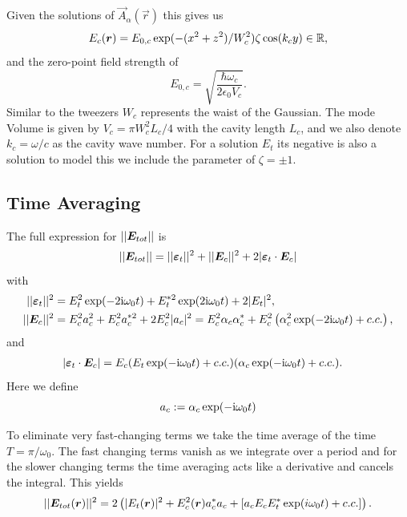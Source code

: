 Given the solutions of $\vec A_\alpha(\vec r)$ this gives us
\begin{equation}
    \label{eq:sp:Ec}
    E_c(\bm{r}) = E_{0,c} \exp(-(x^2+z^2)/W_c^2) \zeta \cos(k_c y) \in \mathbb{R},
\end{equation}
and the zero-point field strength of
\begin{equation}
    \label{eq:sp:Ec0}
    E_{0, c} = \sqrt{\frac{\hbar \omega_c}{2\epsilon_0 V_c}}.
\end{equation}
Similar to the tweezers $W_c$ represents the waist of the Gaussian.
The mode Volume is given by $V_c = \pi W_c^2 L_c /4$ with the cavity length $L_c$,
    and we also denote $k_c = \omega/c$ as the cavity wave number.
For a solution $E_t$ its negative is also a solution
    to model this we include the parameter of $\zeta = \pm 1$.


\subsection{Time Averaging}
\label{ssec:sp:model:timeavg}

The full expression for $||\bm{E}_{tot}||$ is
\begin{equation}
    ||\bm{E}_{tot}|| = ||\bm{\varepsilon}_t||^2 + ||\bm{E}_c||^2 + 2|\bm{\varepsilon}_t \cdot \bm{E}_c|
\end{equation}
with
\begin{align}
    ||\bm{\varepsilon}_t||^2 &= E_t^2 \exp(-2\mathrm{i}\omega_0 t) 
        + E_t^{*2} \exp(2\mathrm{i}\omega_0 t) + 2|E_t|^2, \\
    ||\bm{E}_c||^2 &= E_c^2 a_c^2 + E_c^2 a^{*2}_c + 2E_c^2 |a_c|^2 = E_c^2 \alpha_c \alpha_c^* + E_c^2 \left(\alpha_c^2\exp(-2\mathrm{i}\omega_0t) + c.c. \right), 
\end{align}
and  
\begin{align}
|\bm{\varepsilon}_t \cdot \bm{E}_c| &= E_c(E_t \exp(-\mathrm{i}\omega_0 t) + c.c.) (\alpha_c \exp(-\mathrm{i}\omega_0 t)+c.c.) .
\end{align}
Here we define
\begin{equation}
    a_c := \alpha_c \exp(-\mathrm{i} \omega_0t)
\end{equation}

To eliminate very fast-changing terms
    we take the time average of the time $T = \pi/\omega_0$.
The fast changing terms vanish as we integrate over a period
    and for the slower changing terms the time averaging acts like a derivative and cancels the integral.
This yields
\begin{equation}
    ||\bm{E}_{tot}(\bm{r})||^2 = 2\left(
        |E_t(\bm{r})|^2  
        +  E_c^2(\bm{r}) a_c^* a_c
        +  \left[a_c E_cE_t^* \exp(i\omega_0 t) + c.c.\right]\right).
\end{equation}

